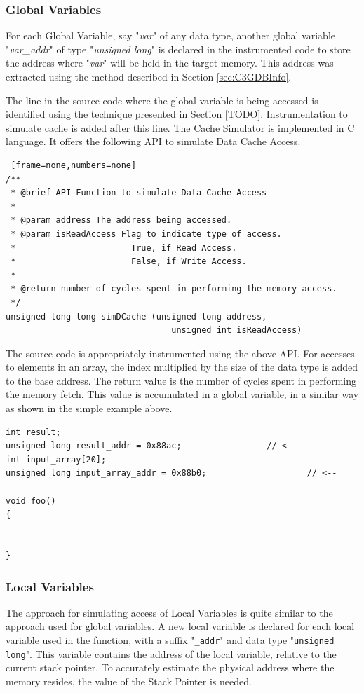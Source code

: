 \subsubsection{Global Variables}
For each Global Variable, say "\textit{var}" of any data type, another global variable "\textit{var\_addr}" of type "\textit{unsigned long}" is declared in the instrumented code to store the address where "\textit{var}" will be held in the target memory. This address was extracted using the method described in Section \ref{sec:C3GDBInfo}.

The line in the source code where the global variable is being accessed is identified using the technique presented in Section [TODO]. Instrumentation to simulate cache is added after this line. The Cache Simulator is implemented in C language. It offers the following API to simulate Data Cache Access.

\begin{lstlisting} [frame=none,numbers=none]
/**
 * @brief API Function to simulate Data Cache Access
 * 
 * @param address The address being accessed.
 * @param isReadAccess Flag to indicate type of access.
 * 					     True, if Read Access.
 * 					     False, if Write Access.
 *
 * @return number of cycles spent in performing the memory access.
 */ 
unsigned long long simDCache (unsigned long address, 
							     unsigned int isReadAccess)
\end{lstlisting}

The source code is appropriately instrumented using the above API. For accesses to elements in an array, the index multiplied by the size of the data type is added to the base address. The return value is the number of cycles spent in performing the memory fetch. This value is accumulated in a global variable, in a similar way as shown in the simple example above.

\begin{lstlisting}
int result;
unsigned long result_addr = 0x88ac;					// <--
int input_array[20];
unsigned long input_array_addr = 0x88b0;					// <--

void foo()
{
	
	
}
\end{lstlisting}

\subsubsection{Local Variables}
The approach for simulating access of Local Variables is quite similar to the approach used for global variables. A new local variable is declared for each local variable used in the function, with a suffix "\texttt{\_addr}" and data type "\texttt{unsigned long}". This variable contains the address of the local variable, relative to the current stack pointer. To accurately estimate the physical address where the memory resides, the value of the Stack Pointer is needed.

